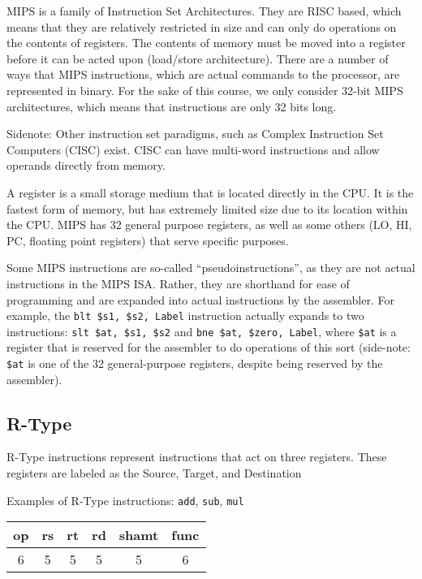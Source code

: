 \documentclass{article}
\begin{document}
MIPS is a family of Instruction Set Architectures. They are RISC based, which means that they are relatively restricted in size and can only do operations on the contents of registers. The contents of memory must be moved into a register before it can be acted upon (load/store architecture). There are a number of ways that MIPS instructions, which are actual commands to the processor, are represented in binary. For the sake of this course, we only consider 32-bit MIPS architectures, which means that instructions are only 32 bits long. 

Sidenote: Other instruction set paradigms, such as Complex Instruction Set Computers (CISC) exist. CISC can have multi-word instructions and allow operands directly from memory. 

A register is a small storage medium that is located directly in the CPU. It is the fastest form of memory, but has extremely limited size due to its location within the CPU. MIPS has 32 general purpose registers, as well as some others (LO, HI, PC, floating point registers) that serve specific purposes. 

Some MIPS instructions are so-called ``pseudoinstructions'', as they are not actual instructions in the MIPS ISA. Rather, they are shorthand for ease of programming and are expanded into actual instructions by the assembler. For example, the \texttt{blt \$s1, \$s2, Label} instruction actually expands to two instructions: \texttt{slt \$at, \$s1, \$s2} and \texttt{bne \$at, \$zero, Label}, where \texttt{\$at} is a register that is reserved for the assembler to do operations of this sort (side-note: \texttt{\$at} is one of the 32 general-purpose registers, despite being reserved by the assembler). 


\subsection{R-Type}\label{RType}
R-Type instructions represent instructions that act on three registers. These registers are labeled as the Source, Target, and Destination

Examples of R-Type instructions: \texttt{add}, \texttt{sub}, \texttt{mul}

\begin{tabular}{|c|c|c|c|c|c|}
    \hline
    op & rs & rt & rd & shamt & func \\
    \hline
    6 & 5 & 5 & 5 & 5 & 6 \\ 
    \hline
\end{tabular}
\end{document}

